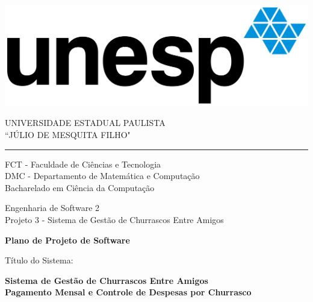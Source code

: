 \thispagestyle{empty}

\begin{minipage}[c]{0.3\textwidth}
\includegraphics[width=\textwidth]{unesp.png}
\end{minipage}
\hspace{10pt}
\begin{minipage}[c]{0.6\textwidth}
\uppercase{Universidade Estadual Paulista \\``Júlio de Mesquita Filho"}
\end{minipage}
\vspace{5mm}
\hrule
\vspace{5mm}
\begin{center}
    FCT - Faculdade de Ciências e Tecnologia\\
    DMC - Departamento de Matemática e Computação\\
    Bacharelado em Ciência da Computação\\
\end{center}

\vspace{1cm}

\begin{center}
    Engenharia de Software 2\\
    Projeto 3 - Sistema de Gestão de Churrascos Entre Amigos
\end{center}

\vspace{1.5cm}

\begin{center}
\Large\textbf{Plano de Projeto de Software}
\end{center}

\vspace{1cm}

Título do Sistema: 
\begin{center}
\Large\textbf{Sistema de Gestão de Churrascos Entre Amigos}\\[0.5cm]
\large\textbf{Pagamento Mensal e Controle de Despesas por Churrasco}
\end{center}

